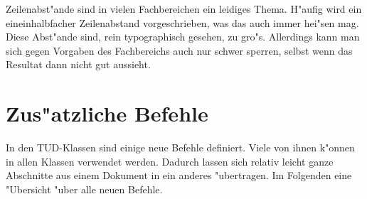 \documentclass[twoside,colorback,accentcolor=tud4c,11pt]{tudreport}
\begin{document}
    Zeilenabst"ande sind in vielen Fachbereichen ein leidiges Thema. H"aufig
    wird ein \glqq eineinhalbfacher\grqq{} Zeilenabstand vorgeschrieben, was das
    auch immer hei"sen mag. Diese Abst"ande sind, rein typographisch
    gesehen, zu gro"s. Allerdings kann man sich gegen Vorgaben des
    Fachbereichs auch nur schwer sperren, selbst wenn das Resultat dann nicht
    gut aussieht.

  \section{Zus"atzliche Befehle}\label{sec_befehle}

    In den TUD-Klassen sind einige neue Befehle definiert. Viele von ihnen
    k"onnen in allen Klassen verwendet werden. Dadurch lassen sich relativ
    leicht ganze Abschnitte aus einem Dokument in ein anderes "ubertragen. Im
    Folgenden eine "Ubersicht "uber alle neuen Befehle.
\end{document}
